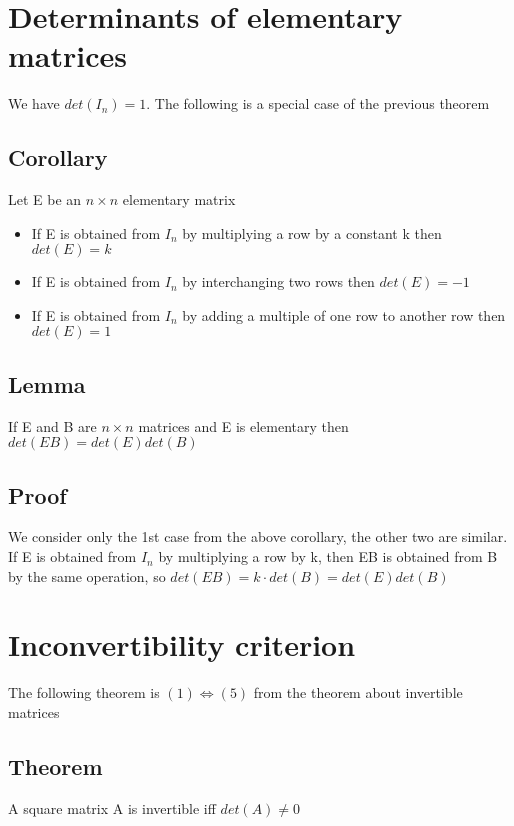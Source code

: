 \documentclass{article}[18pt]
\begin{document}
\section{Determinants of elementary matrices}
We have $det(I_n)=1$. The following is a special case of the previous theorem
\subsection{Corollary}
Let E be an $n\times n$ elementary matrix
\begin{itemize}
	\item If E is obtained from $I_n$ by multiplying a row by a constant k then $det(E)=k$
	\item If E is obtained from $I_n$ by interchanging two rows then $det(E)=-1$
	\item If E is obtained from $I_n$ by adding a multiple of one row to another row then $det(E)=1$
\end{itemize}
\subsection{Lemma}
If E and B are $n\times n$ matrices and E is elementary then $det(EB)=det(E)det(B)$
\subsection{Proof}
We consider only the 1st case from the above corollary, the other two are similar. If E is obtained from $I_n$ by multiplying a row by k, then EB is obtained from B by the same operation, so $det(EB)=k\cdot det (B)=det(E)det(B)$
\section{Inconvertibility criterion}
The following theorem is $(1)\Leftrightarrow (5)$ from the theorem about invertible matrices
\subsection{Theorem}
A square matrix A is invertible iff $det(A)\neq 0$
\end{document}
